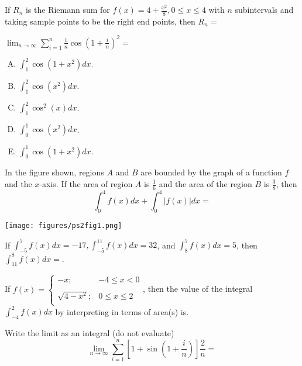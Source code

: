 \documentclass[
  course = {{MATH102 Calculus II}},
  quartile = {{2}},
  assignment = {{Section: 5.2}},
  firstexercise = 1,
  term = 203
]{aga-homework}
\begin{document}
\problem  If $R_n$ is the Riemann sum for $f(x)= 4 + \frac{x^2}{8}, 0 \leq x \leq 4$
with $n$ subintervals and taking sample points to be the right end points, then $R_n =$


\newpage

\problem $\lim_{n\to \infty}\sum_{i=1}^n\frac{1}{n}\cos\left(1+\frac{i}{n}\right)^2=$

\begin{enumerate}[(A)]
  \item $\int_{1}^{2}\cos(1+x^2)dx$.
  \item $\int_{1}^{2}\cos(x^2)dx$.
  \item $\int_{1}^{2}\cos^2(x)dx$.
  \item $\int_{0}^{1}\cos(x^2)dx$.
  \item $\int_{0}^{1}\cos(1+x^2)dx$.
\end{enumerate}

\newpage


\problem
\begin{minipage}[t]{0.6\textwidth}
\vspace{0pt}
  In the figure shown, regions $A$ and $B$ are bounded by the graph of a function $f$ and the $x$-axis. If the area of region $A$ is $\frac{1}{6}$ and the area of the region $B$ is $\frac{3}{8}$, then
  \[
  \int_0^4f(x) dx + \int_{0}^{4}|f(x)| dx =
  \]
\end{minipage}
\begin{minipage}[r]{0.4\textwidth}
	\texttt{[image: figures/ps2fig1.png]}
\end{minipage}

\newpage


\problem If $\int_{-5}^7f(x)dx=-17, \int_{-5}^{11}f(x)dx=32$, and $\int_{8}^7f(x)dx=5$, then $\int_{11}^8f(x)dx=$.

\newpage

\problem If ${\displaystyle f(x) = \left\{\begin{array}{ll}
         -x; & -4\leq x <0 \\
         \\
         \sqrt{4-x^2}; & 0\leq x \leq 2 \\
       \end{array}\right.}$, then the value of the integral
       $ \displaystyle
       \int_{-4}^{2} f(x) dx
       $
       by interpreting in terms of area(s) is.


\newpage
\problem Write the limit as an integral (do not evaluate) \[\displaystyle \lim_{n\to \infty} \sum_{i=1}^{n}\left[1+\sin\left(1+\frac{i}{n}\right)\right]\frac{2}{n}=
\]
\end{document}
